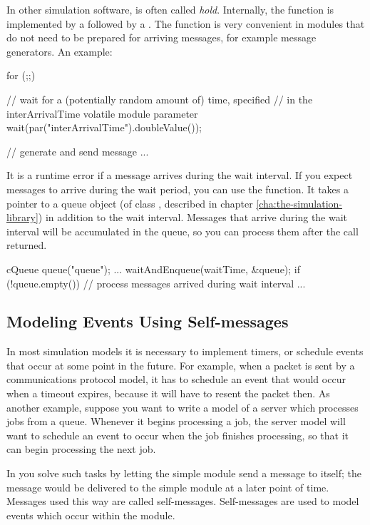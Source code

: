 In other simulation software,  is often called \textit{hold}.
Internally, the  function is implemented by a
 followed by a .
The  function is very convenient in modules that do not need
to be prepared for arriving messages, for example message generators.
An example:

\begin{cpp}
for (;;)
{
  // wait for a (potentially random amount of) time, specified
  // in the interArrivalTime volatile module parameter
  wait(par("interArrivalTime").doubleValue());

  // generate and send message
  ...
}
\end{cpp}

It is a runtime error if a message arrives during the wait interval.
If you expect messages to arrive during the wait period, you can
use the  function. It takes a pointer to a queue object
(of class , described in chapter \ref{cha:the-simulation-library})
in addition to the wait interval. Messages that arrive during the
wait interval will be accumulated in the queue, so you can
process them after the  call returned.

\begin{cpp}
cQueue queue("queue");
...
waitAndEnqueue(waitTime, &queue);
if (!queue.empty())
{
  // process messages arrived during wait interval
  ...
}
\end{cpp}


\subsection{Modeling Events Using Self-messages}
\label{sec:ch-simple-modules:self-messages}

In most simulation models it is necessary to implement timers,
or schedule events that occur at some point in the future.
For example, when a packet is sent by a communications protocol model,
it has to schedule an event that would occur when a timeout expires,
because it will have to resent the packet then.
As another example, suppose you want to write a model of a server which
processes jobs from a queue. Whenever it begins processing
a job, the server model will want to schedule an event to occur
when the job finishes processing, so that it can begin processing
the next job.

In {\opp} you solve such tasks by letting the simple module
send a message to itself; the message would be delivered
to the simple module at a later point of time. Messages used
this way are called self-messages.
Self-messages are used to model events which occur within the module.

